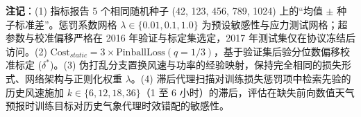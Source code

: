 \begin{table}[!t]
\begin{threeparttable}
\begin{tablenotes}[flushleft]
\item \textbf{注记}：(1) 指标报告 5 个相同随机种子 (42, 123, 456, 789, 1024) 上的“均值 $\pm$ 种子标准差”。惩罚系数网格 $\lambda \in \{0.01, 0.1, 1.0\}$ 为预设敏感性与应力测试网格；超参数与校准偏移严格在 2016 年验证与标定集选定，2017 年测试集仅在协议冻结后访问。(2) $\text{Cost}_{static} = 3 \times \text{PinballLoss}(q=1/3)$，基于验证集后验分位数偏移校准标定 ($\delta^*$)。(3) 伪打乱分支置换风速与功率的经验映射，保持完全相同的损失形式、网络架构与正则化权重 $\lambda$。(4) 滞后代理扫描对训练损失惩罚项中检索先验的历史风速施加 $k \in \{6, 12, 18, 36\}$（1 至 6 小时）的滞后，评估在缺失前向数值天气预报时训练目标对历史气象代理时效错配的敏感性。
\end{tablenotes}
\end{threeparttable}
\end{table}
